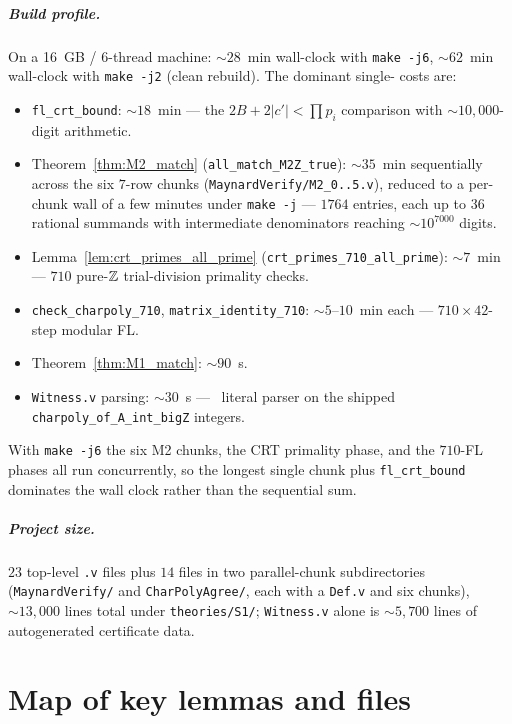 \paragraph{Build profile.}
On a 16~GB / 6-thread machine: ${\sim}28$~min wall-clock with
\texttt{make -j6}, ${\sim}62$~min wall-clock with \texttt{make -j2}
(clean rebuild). The dominant single-\Qed{} costs are:
\begin{itemize}
\item \texttt{fl\_crt\_bound}: ${\sim}18$~min — the
  $2B + 2|c'| < \prod p_i$ comparison with ${\sim}10{,}000$-digit
  arithmetic.
\item Theorem~\ref{thm:M2_match}
  (\texttt{all\_match\_M2Z\_true}): ${\sim}35$~min sequentially across
  the six $7$-row chunks (\texttt{MaynardVerify/M2\_0..5.v}), reduced to
  a per-chunk wall of a few minutes under \texttt{make -j} — $1764$
  entries, each up to $36$ rational summands with intermediate
  denominators reaching $\sim 10^{7000}$ digits.
\item Lemma~\ref{lem:crt_primes_all_prime}
  (\texttt{crt\_primes\_710\_all\_prime}): ${\sim}7$~min — $710$
  pure-$\mathbb{Z}$ trial-division primality checks.
\item \texttt{check\_charpoly\_710}, \texttt{matrix\_identity\_710}:
  ${\sim}5$--$10$~min each — $710 \times 42$-step modular FL.
\item Theorem~\ref{thm:M1_match}: ${\sim}90$~s.
\item \texttt{Witness.v} parsing: ${\sim}30$~s — \BigZ\ literal parser
  on the shipped \texttt{charpoly\_of\_A\_int\_bigZ} integers.
\end{itemize}
With \texttt{make -j6} the six M2 chunks, the CRT primality phase, and
the $710$-FL phases all run concurrently, so the longest single chunk
plus \texttt{fl\_crt\_bound} dominates the wall clock rather than the
sequential sum.

\paragraph{Project size.} $23$ top-level \texttt{.v} files plus $14$
files in two parallel-chunk subdirectories (\texttt{MaynardVerify/} and
\texttt{CharPolyAgree/}, each with a \texttt{Def.v} and six chunks),
${\sim}13{,}000$ lines total under \texttt{theories/S1/};
\texttt{Witness.v} alone is ${\sim}5{,}700$ lines of autogenerated
certificate data.

\chapter{Map of key lemmas and files}\label{ch:map}

